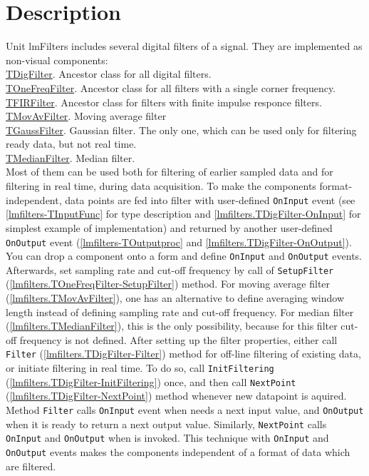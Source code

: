 \documentclass[12pt,a4paper,oneside]{report}
\newcommand{\code}[1]{\texttt{#1}}
\begin{document}
\section{Description}
Unit lmFilters includes several digital filters of a signal. They are implemented as non-visual components:\\
\hyperref[lmfilters.TDigFilter]{TDigFilter}. Ancestor class for all digital filters.\\
\hyperref[lmfilters.TOneFreqFilter]{TOneFreqFilter}. Ancestor class for all filters with a single corner frequency.\\
\hyperref[lmfilters.TFIRFilter]{TFIRFilter}. Ancestor class for filters with finite impulse responce filters.\\
\hyperref[lmfilters.TMovAvFilter]{TMovAvFilter}. Moving average filter\\
\hyperref[lmfilters.TGaussFilter]{TGaussFilter}. Gaussian filter. The only one, which can be used only for filtering ready data, but not real time.\\
\hyperref[lmfilters.TMedianFilter]{TMedianFilter}. Median filter.\\

Most of them can be used both for filtering of earlier sampled data and for filtering in real time, during data acquisition. To make the components format-independent, data points are fed into filter with user-defined \code{OnInput} event (see \ref{lmfilters-TInputFunc} for type description and \ref{lmfilters.TDigFilter-OnInput} for simplest example of implementation) and returned by another user-defined \code{OnOutput} event (\ref{lmfilters-TOutputproc} and \ref{lmfilters.TDigFilter-OnOutput}). You can drop a component onto a form and define \code{OnInput} and \code{OnOutput} events. Afterwards, set sampling rate and cut-off frequency by call of \code{SetupFilter} (\ref{lmfilters.TOneFreqFilter-SetupFilter}) method. For moving average filter (\ref{lmfilters.TMovAvFilter}), one has an alternative to define averaging window length instead of defining sampling rate and cut-off frequency. For median filter (\ref{lmfilters.TMedianFilter}), this is the only possibility, because for this filter cut-off frequency is not defined. After setting up the filter properties,  either call \code{Filter} (\ref{lmfilters.TDigFilter-Filter}) method for off-line filtering of existing data, or initiate filtering in real time. To do so, call \code{InitFiltering}  (\ref{lmfilters.TDigFilter-InitFiltering}) once, and then call \code{NextPoint} (\ref{lmfilters.TDigFilter-NextPoint}) method whenever new datapoint is aquired. Method \code{Filter} calls \code{OnInput} event when needs a next input value, and \code{OnOutput} when it is ready to return a next output value. Similarly, \code{NextPoint} calls \code{OnInput} and \code{OnOutput} when is invoked. This technique with \code{OnInput} and \code{OnOutput} events makes the components independent of a format of data which are filtered. 
\end{document}
